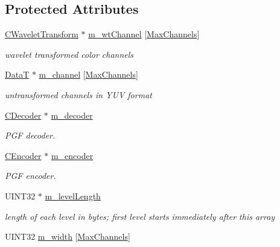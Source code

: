 \subsection*{Protected Attributes}
\begin{DoxyCompactItemize}
\item 
\mbox{\hyperlink{classCWaveletTransform}{C\+Wavelet\+Transform}} $\ast$ \mbox{\hyperlink{classCPGFImage_ae3901a689b7d1dd46d48b042c3d31d5c}{m\+\_\+wt\+Channel}} \mbox{[}\mbox{\hyperlink{PGFtypes_8h_a94219182f88d4dbed1021ed04db75e41}{Max\+Channels}}\mbox{]}
\begin{DoxyCompactList}\small\item\em wavelet transformed color channels \end{DoxyCompactList}\item 
\mbox{\hyperlink{PGFtypes_8h_acb1ee3f52ccfad782dcaa0abd79e5d05}{DataT}} $\ast$ \mbox{\hyperlink{classCPGFImage_a36f7f20b38a9cb3a9c88032f5f886345}{m\+\_\+channel}} \mbox{[}\mbox{\hyperlink{PGFtypes_8h_a94219182f88d4dbed1021ed04db75e41}{Max\+Channels}}\mbox{]}
\begin{DoxyCompactList}\small\item\em untransformed channels in Y\+UV format \end{DoxyCompactList}\item 
\mbox{\hyperlink{classCDecoder}{C\+Decoder}} $\ast$ \mbox{\hyperlink{classCPGFImage_a1058b29a3d046e171a2fe48168b66d38}{m\+\_\+decoder}}
\begin{DoxyCompactList}\small\item\em P\+GF decoder. \end{DoxyCompactList}\item 
\mbox{\hyperlink{classCEncoder}{C\+Encoder}} $\ast$ \mbox{\hyperlink{classCPGFImage_a6ef048255812525cd56d7b04df5e6731}{m\+\_\+encoder}}
\begin{DoxyCompactList}\small\item\em P\+GF encoder. \end{DoxyCompactList}\item 
U\+I\+N\+T32 $\ast$ \mbox{\hyperlink{classCPGFImage_a1635ef5dca13bd07276d112a72316a73}{m\+\_\+level\+Length}}
\begin{DoxyCompactList}\small\item\em length of each level in bytes; first level starts immediately after this array \end{DoxyCompactList}\item 
U\+I\+N\+T32 \mbox{\hyperlink{classCPGFImage_ab6d97aca28795fae697fdda4b8acd8f9}{m\+\_\+width}} \mbox{[}\mbox{\hyperlink{PGFtypes_8h_a94219182f88d4dbed1021ed04db75e41}{Max\+Channels}}\mbox{]}

\end{DoxyCompactItemize}
